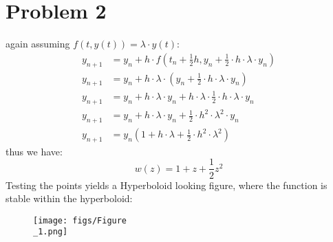 \documentclass{article}
\begin{document}
\section*{Problem 2}
again assuming $f(t, y(t)) = \lambda \cdot y(t)$: \\
\begin{align*}
y_{n+1} &= y_n + h \cdot f(t_n + \frac{1}{2}h, y_n + \frac{1}{2} \cdot h \cdot \lambda \cdot y_n) \\
y_{n+1} &= y_n + h \cdot \lambda \cdot ( y_n + \frac{1}{2} \cdot h \cdot \lambda \cdot y_n) \\
y_{n+1} &= y_n + h \cdot \lambda \cdot y_n + h \cdot \lambda \cdot  \frac{1}{2} \cdot h \cdot \lambda \cdot y_n \\
y_{n+1} &= y_n + h \cdot \lambda \cdot y_n + \frac{1}{2} \cdot h^2 \cdot \lambda^2 \cdot y_n \\
y_{n+1} &= y_n(1 + h \cdot \lambda + \frac{1}{2} \cdot h^2 \cdot \lambda^2)
\end{align*}
thus we have: \\
\[
w(z) = 1 + z + \frac{1}{2}z^2
\]
Testing the points yields a Hyperboloid looking figure, where the function is stable within the hyperboloid: \\
\begin{figure}[!h]
\centering
\texttt{[image: figs/Figure\\\_1.png]}
\end{figure}
\newpage
\end{document}
